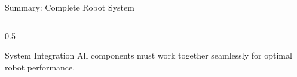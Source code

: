 \documentclass[10pt]{beamer}
\begin{document}
\begin{frame}{Summary: Complete Robot System}
\begin{columns}
        \begin{column}{0.5\textwidth}
            \begin{exampleblock}{System Integration}
                All components must work together seamlessly for optimal robot performance.
            \end{exampleblock}
        \end{column}
    \end{columns}
\end{frame}
\end{document}
